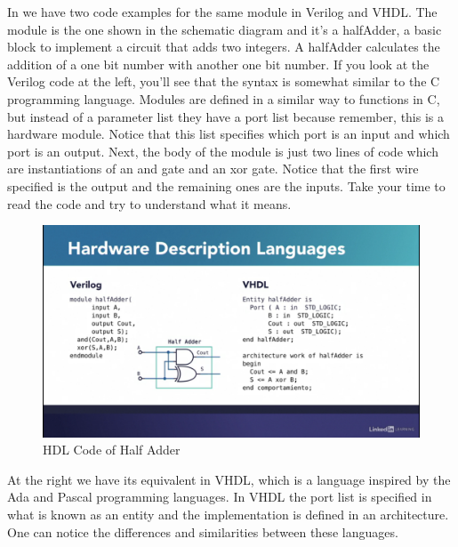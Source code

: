 In  we have two code examples for the same module in Verilog and VHDL. The module is the one shown in the schematic diagram and it's a halfAdder, a basic block to implement a circuit that adds two integers. A halfAdder calculates the addition of a one bit number with another one bit number. If you look at the Verilog code at the left, you'll see that the syntax is somewhat similar to the C programming language. Modules are defined in a similar way to functions in C, but instead of a parameter list they have a port list because remember, this is a hardware module. Notice that this list specifies which port is an input and which port is an output. Next, the body of the module is just two lines of code which are instantiations of an and gate and an xor gate. Notice that the first wire specified is the output and the remaining ones are the inputs. Take your time to read the code and try to understand what it means. 

\begin{figure}[H]
	\begin{center}
		\includegraphics[width=5in]{images/HDL.png}
		\caption{HDL Code of Half Adder}
		\label{HDLCode}
	\end{center}
\end{figure}

At the right we have its equivalent in VHDL, which is a language inspired by the Ada and Pascal programming languages. In VHDL the port list is specified in what is known as an entity and the implementation is defined in an architecture. One can notice the differences and similarities between these languages.

